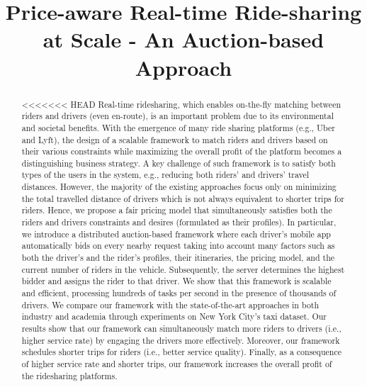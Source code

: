\documentclass[]{sig-alternate-05-2015}
\title{Price-aware Real-time Ride-sharing at Scale - An Auction-based Approach}
\author{}
\begin{document}
\maketitle

\begin{abstract}
<<<<<<< HEAD
Real-time ridesharing, which enables on-the-fly matching between riders and drivers (even en-route), is an important problem due to its environmental and societal benefits. With the emergence of many ride sharing platforms (e.g., Uber and Lyft), the design of a scalable framework to match riders and drivers based on their various constraints while maximizing the overall profit of the platform becomes a distinguishing business strategy.
A key challenge of such framework is to satisfy both types of the users in the system, e.g., reducing both riders' and drivers' travel distances. However, the majority of the existing approaches focus only on minimizing the total travelled distance of drivers which is not always equivalent to shorter trips for riders. Hence, we propose a fair pricing model that simultaneously satisfies both the riders and drivers constraints and desires (formulated as their profiles). In particular, we introduce a distributed auction-based framework where each driver's mobile app automatically bids on every nearby request taking into account many factors such as both the driver's and the rider's profiles, their itineraries, the pricing model, and the current number of riders in the vehicle.  Subsequently, the server determines the highest bidder and assigns the rider to that driver. We show that this framework is scalable and efficient, processing hundreds of tasks per second in the presence of thousands of drivers. We compare our framework with the state-of-the-art approaches in both industry and academia through experiments on New York City's taxi dataset.  Our results show that our framework can simultaneously match more riders to drivers (i.e., higher service rate) by engaging the drivers more effectively. Moreover, our framework schedules shorter trips for riders (i.e., better service quality).   Finally, as a consequence of higher service rate and shorter trips, our framework increases the overall profit of the ridesharing platforms. 
\end{abstract}



%
%






\vspace{-0.1in}

\begin{scriptsize}


\end{scriptsize}
\end{document}
